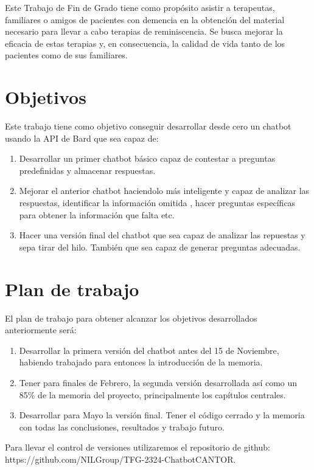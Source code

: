 Este Trabajo de Fin de Grado tiene como propósito asistir a terapeutas, familiares o amigos de pacientes con demencia en la obtención del material necesario para llevar a cabo terapias de reminiscencia. Se busca mejorar la eficacia de estas terapias y, en consecuencia, la calidad de vida tanto de los pacientes como de sus familiares. 


\section{Objetivos}

Este trabajo tiene como objetivo conseguir desarrollar desde cero un chatbot usando la API de Bard que  sea capaz de: \begin{enumerate}
\item Desarrollar un primer chatbot básico capaz de contestar a preguntas predefinidas y almacenar respuestas. 
\item Mejorar el anterior chatbot haciendolo más inteligente y capaz de analizar las respuestas, identificar la información omitida , hacer preguntas específicas para obtener la información que falta etc. 
\item Hacer una versión final del chatbot que sea capaz de analizar las repuestas y sepa tirar del hilo. También que sea capaz de generar preguntas adecuadas. 
\end{enumerate}

\section{Plan de trabajo}

El plan de trabajo para obtener alcanzar los objetivos desarrollados anteriormente será: \begin{enumerate}
	\item Desarrollar la primera versión del chatbot antes del 15 de Noviembre, habiendo trabajado para entonces la introducción de la memoria.
	\item Tener para finales de Febrero, la segunda versión desarrollada así como un 85\% de la memoria del proyecto, principalmente los capítulos centrales.  
	\item Desarrollar para Mayo la versión final. Tener el código cerrado y la memoria con todas las conclusiones, resultados y trabajo futuro. 
	
\end{enumerate}

Para llevar el control de versiones utilizaremos el repositorio de github:\\
 https://github.com/NILGroup/TFG-2324-ChatbotCANTOR. 

